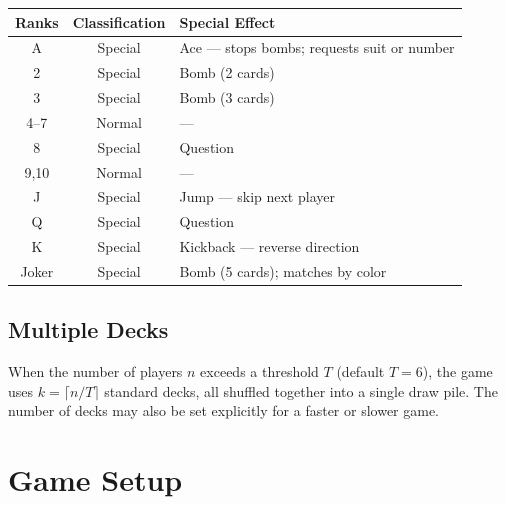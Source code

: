 \documentclass[11pt,a4paper,twoside]{article}
\theoremstyle{definition}
\theoremstyle{remark}
\begin{document}
\begin{center}
\begin{tabular}{ccl}
\toprule
\textbf{Ranks} & \textbf{Classification} & \textbf{Special Effect} \\
\midrule
A    & Special   & Ace --- stops bombs; requests suit or number \\
2    & Special   & Bomb (2 cards) \\
3    & Special   & Bomb (3 cards) \\
4--7 & Normal    & --- \\
8    & Special   & Question \\
9,10 & Normal   & --- \\
J    & Special   & Jump --- skip next player \\
Q    & Special   & Question \\
K    & Special   & Kickback --- reverse direction \\
Joker& Special   & Bomb (5 cards); matches by color \\
\bottomrule
\end{tabular}
\end{center}

\subsection{Multiple Decks}

When the number of players $n$ exceeds a threshold $T$ (default $T = 6$), the
game uses $k = \lceil n / T \rceil$ standard decks, all shuffled together into
a single draw pile. The number of decks may also be set explicitly for a
faster or slower game.

\section{Game Setup}
\label{sec:setup}
\end{document}
